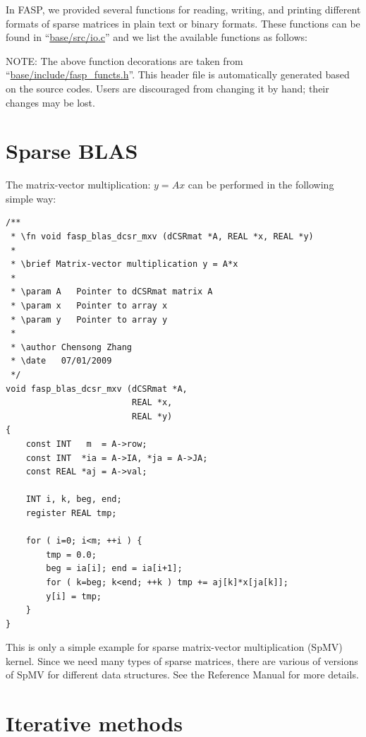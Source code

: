 \documentclass[11pt]{memoir}
\begin{document}
In FASP, we provided several functions for reading, writing, and printing different formats of sparse matrices in plain text or binary formats. These functions can be found in ``\url{base/src/io.c}'' and we list the available functions as follows:
%

%
\begin{snugshade}\noindent
  NOTE: The above function decorations are taken from
  ``\url{base/include/fasp\_functs.h}''. This header file is
  automatically generated based on the source codes. Users are discouraged
  from changing it by hand; their changes may be lost. 
\end{snugshade}


\section{Sparse BLAS}

The matrix-vector multiplication: $y=Ax$ can be performed in the
following simple way:

\begin{lstlisting}
/**
 * \fn void fasp_blas_dcsr_mxv (dCSRmat *A, REAL *x, REAL *y)
 *
 * \brief Matrix-vector multiplication y = A*x
 *
 * \param A   Pointer to dCSRmat matrix A
 * \param x   Pointer to array x
 * \param y   Pointer to array y
 *
 * \author Chensong Zhang
 * \date   07/01/2009
 */
void fasp_blas_dcsr_mxv (dCSRmat *A,
                         REAL *x,
                         REAL *y)
{
    const INT   m  = A->row;
    const INT  *ia = A->IA, *ja = A->JA;
    const REAL *aj = A->val;

    INT i, k, beg, end;
    register REAL tmp;

    for ( i=0; i<m; ++i ) {
        tmp = 0.0;
        beg = ia[i]; end = ia[i+1];
        for ( k=beg; k<end; ++k ) tmp += aj[k]*x[ja[k]];
        y[i] = tmp;
    }
}
\end{lstlisting}

This is only a simple example for sparse matrix-vector multiplication (SpMV) kernel. Since we need many types of sparse matrices, there are various of versions of SpMV for different data structures. See the Reference Manual for more details.

\section{Iterative methods}\label{sec:iter}
\end{document}
